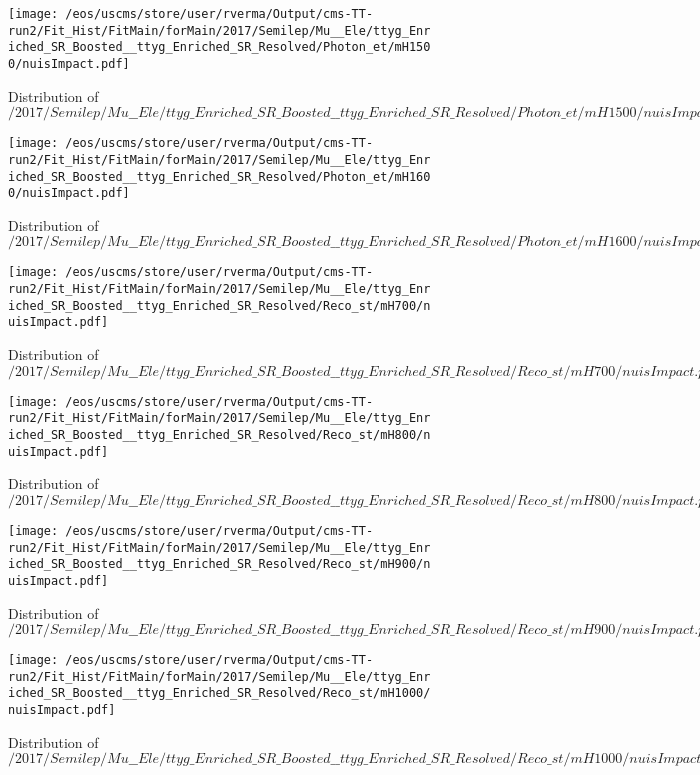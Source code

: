 \begin{figure}
\centering
\texttt{[image: /eos/uscms/store/user/rverma/Output/cms-TT-run2/Fit\_Hist/FitMain/forMain/2017/Semilep/Mu\_\_Ele/ttyg\_Enriched\_SR\_Boosted\_\_ttyg\_Enriched\_SR\_Resolved/Photon\_et/mH1500/nuisImpact.pdf]}
\caption{Distribution of $/2017/Semilep/Mu\_\_Ele/ttyg\_Enriched\_SR\_Boosted\_\_ttyg\_Enriched\_SR\_Resolved/Photon\_et/mH1500/nuisImpact.pdf$}
\end{figure}

\begin{figure}
\centering
\texttt{[image: /eos/uscms/store/user/rverma/Output/cms-TT-run2/Fit\_Hist/FitMain/forMain/2017/Semilep/Mu\_\_Ele/ttyg\_Enriched\_SR\_Boosted\_\_ttyg\_Enriched\_SR\_Resolved/Photon\_et/mH1600/nuisImpact.pdf]}
\caption{Distribution of $/2017/Semilep/Mu\_\_Ele/ttyg\_Enriched\_SR\_Boosted\_\_ttyg\_Enriched\_SR\_Resolved/Photon\_et/mH1600/nuisImpact.pdf$}
\end{figure}

\begin{figure}
\centering
\texttt{[image: /eos/uscms/store/user/rverma/Output/cms-TT-run2/Fit\_Hist/FitMain/forMain/2017/Semilep/Mu\_\_Ele/ttyg\_Enriched\_SR\_Boosted\_\_ttyg\_Enriched\_SR\_Resolved/Reco\_st/mH700/nuisImpact.pdf]}
\caption{Distribution of $/2017/Semilep/Mu\_\_Ele/ttyg\_Enriched\_SR\_Boosted\_\_ttyg\_Enriched\_SR\_Resolved/Reco\_st/mH700/nuisImpact.pdf$}
\end{figure}

\begin{figure}
\centering
\texttt{[image: /eos/uscms/store/user/rverma/Output/cms-TT-run2/Fit\_Hist/FitMain/forMain/2017/Semilep/Mu\_\_Ele/ttyg\_Enriched\_SR\_Boosted\_\_ttyg\_Enriched\_SR\_Resolved/Reco\_st/mH800/nuisImpact.pdf]}
\caption{Distribution of $/2017/Semilep/Mu\_\_Ele/ttyg\_Enriched\_SR\_Boosted\_\_ttyg\_Enriched\_SR\_Resolved/Reco\_st/mH800/nuisImpact.pdf$}
\end{figure}

\begin{figure}
\centering
\texttt{[image: /eos/uscms/store/user/rverma/Output/cms-TT-run2/Fit\_Hist/FitMain/forMain/2017/Semilep/Mu\_\_Ele/ttyg\_Enriched\_SR\_Boosted\_\_ttyg\_Enriched\_SR\_Resolved/Reco\_st/mH900/nuisImpact.pdf]}
\caption{Distribution of $/2017/Semilep/Mu\_\_Ele/ttyg\_Enriched\_SR\_Boosted\_\_ttyg\_Enriched\_SR\_Resolved/Reco\_st/mH900/nuisImpact.pdf$}
\end{figure}

\begin{figure}
\centering
\texttt{[image: /eos/uscms/store/user/rverma/Output/cms-TT-run2/Fit\_Hist/FitMain/forMain/2017/Semilep/Mu\_\_Ele/ttyg\_Enriched\_SR\_Boosted\_\_ttyg\_Enriched\_SR\_Resolved/Reco\_st/mH1000/nuisImpact.pdf]}
\caption{Distribution of $/2017/Semilep/Mu\_\_Ele/ttyg\_Enriched\_SR\_Boosted\_\_ttyg\_Enriched\_SR\_Resolved/Reco\_st/mH1000/nuisImpact.pdf$}
\end{figure}

